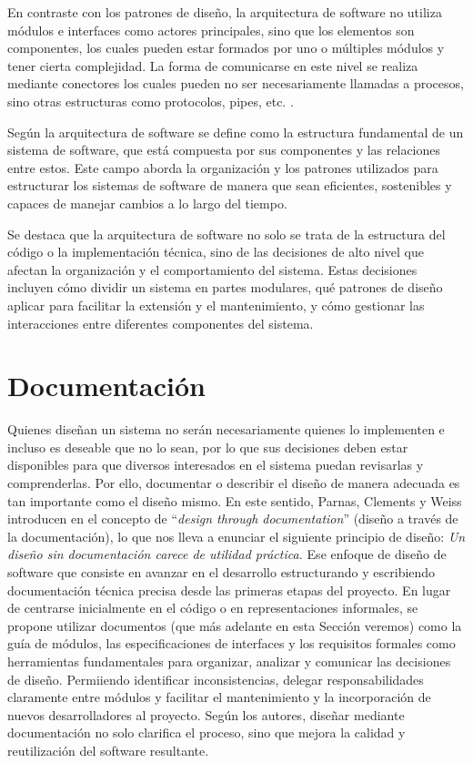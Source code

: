 En contraste con los patrones de diseño, la arquitectura de software no utiliza módulos e interfaces como actores principales, sino que los elementos son componentes, los cuales pueden estar formados por uno o múltiples módulos y tener cierta complejidad. La forma de comunicarse en este nivel se realiza mediante conectores los cuales pueden no ser necesariamente llamadas a procesos, sino otras estructuras como protocolos, pipes, etc. \cite{bass2003, buschmann1996posa1}.

Según \cite{ShawGarlan1996} la arquitectura de software se define como la estructura fundamental de un sistema de software, que está compuesta por sus componentes y las relaciones entre estos. Este campo aborda la organización y los patrones utilizados para estructurar los sistemas de software de manera que sean eficientes, sostenibles y capaces de manejar cambios a lo largo del tiempo.

Se destaca que la arquitectura de software no solo se trata de la estructura del código o la implementación técnica, sino de las decisiones de alto nivel que afectan la organización y el comportamiento del sistema. Estas decisiones incluyen cómo dividir un sistema en partes modulares, qué patrones de diseño aplicar para facilitar la extensión y el mantenimiento, y cómo gestionar las interacciones entre diferentes componentes del sistema.

\section{Documentación}

Quienes diseñan un sistema no serán necesariamente quienes lo implementen e incluso es deseable que no lo sean, por lo que sus decisiones deben estar disponibles para que diversos interesados en el sistema puedan revisarlas y comprenderlas. Por ello, documentar o describir el diseño de manera adecuada es tan importante como el diseño mismo. En este sentido, Parnas, Clements y Weiss introducen en el concepto de ``\textit{design through documentation}'' (diseño a través de la documentación), lo que nos lleva a enunciar el siguiente principio de diseño: \textit{Un diseño sin documentación carece de utilidad práctica.} Ese enfoque de diseño de software que consiste en avanzar en el desarrollo estructurando y escribiendo documentación técnica precisa desde las primeras etapas del proyecto. En lugar de centrarse inicialmente en el código o en representaciones informales, se propone utilizar documentos (que más adelante en esta Sección veremos) como la guía de módulos, las especificaciones de interfaces y los requisitos formales como herramientas fundamentales para organizar, analizar y comunicar las decisiones de diseño. Permiiendo identificar inconsistencias, delegar responsabilidades claramente entre módulos y facilitar el mantenimiento y la incorporación de nuevos desarrolladores al proyecto. Según los autores, diseñar mediante documentación no solo clarifica el proceso, sino que mejora la calidad y reutilización del software resultante.

